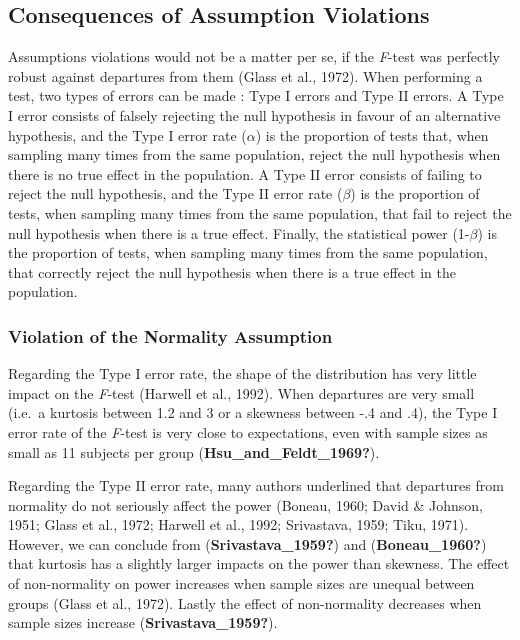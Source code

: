 \documentclass[
  english,
  man]{apa6}
\begin{document}
\hypertarget{consequences-of-assumption-violations}{%
\subsection{Consequences of Assumption Violations}\label{consequences-of-assumption-violations}}

Assumptions violations would not be a matter per se, if the \emph{F}-test was perfectly robust against departures from them (Glass et al., 1972). When performing a test, two types of errors can be made : Type I errors and Type II errors. A Type I error consists of falsely rejecting the null hypothesis in favour of an alternative hypothesis, and the Type I error rate (\(\alpha\)) is the proportion of tests that, when sampling many times from the same population, reject the null hypothesis when there is no true effect in the population. A Type II error consists of failing to reject the null hypothesis, and the Type II error rate (\(\beta\)) is the proportion of tests, when sampling many times from the same population, that fail to reject the null hypothesis when there is a true effect. Finally, the statistical power (1-\(\beta\)) is the proportion of tests, when sampling many times from the same population, that correctly reject the null hypothesis when there is a true effect in the population.

\hypertarget{violation-of-the-normality-assumption}{%
\subsubsection{Violation of the Normality Assumption}\label{violation-of-the-normality-assumption}}

Regarding the Type I error rate, the shape of the distribution has very little impact on the \emph{F}-test (Harwell et al., 1992). When departures are very small (i.e.~a kurtosis between 1.2 and 3 or a skewness between -.4 and .4), the Type I error rate of the \emph{F}-test is very close to expectations, even with sample sizes as small as 11 subjects per group (\textbf{Hsu\_and\_Feldt\_1969?}).

Regarding the Type II error rate, many authors underlined that departures from normality do not seriously affect the power (Boneau, 1960; David \(\&\) Johnson, 1951; Glass et al., 1972; Harwell et al., 1992; Srivastava, 1959; Tiku, 1971). However, we can conclude from (\textbf{Srivastava\_1959?}) and (\textbf{Boneau\_1960?}) that kurtosis has a slightly larger impacts on the power than skewness. The effect of non-normality on power increases when sample sizes are unequal between groups (Glass et al., 1972). Lastly the effect of non-normality decreases when sample sizes increase (\textbf{Srivastava\_1959?}).
\end{document}
